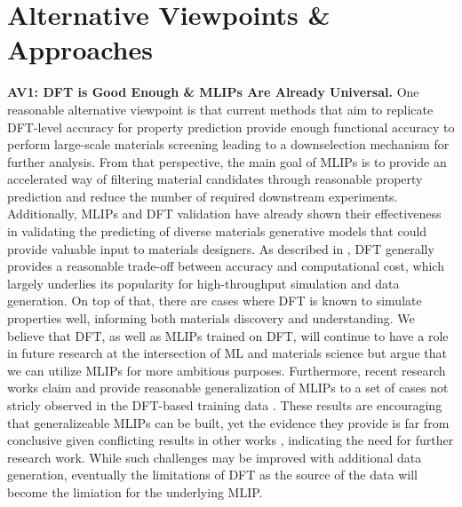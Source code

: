\vspace{-0.2cm}
\section{Alternative Viewpoints \& Approaches}
\vspace{-0.1cm}
\textbf{AV1: DFT is Good Enough \& MLIPs Are Already Universal.} One reasonable alternative viewpoint is that current methods that aim to replicate DFT-level accuracy for property prediction provide enough functional accuracy to perform large-scale materials screening leading to a downselection mechanism for further analysis. From that perspective, the main goal of MLIPs is to provide an accelerated way of filtering material candidates through reasonable property prediction and reduce the number of required downstream experiments. Additionally, MLIPs and DFT validation have already shown their effectiveness in validating the predicting of diverse materials generative models \citep{merchant2023scaling, levy2024symmcd, jiao2024space, zeni2025generative, miller2024flowmm, ding2024matexpert, gruver2024finetuned} that could provide valuable input to materials designers. As described in , DFT generally provides a reasonable trade-off between accuracy and computational cost, which largely underlies its popularity for high-throughput simulation and data generation. On top of that, there are cases where DFT is known to simulate properties well, informing both materials discovery and understanding. We believe that DFT, as well as MLIPs trained on DFT, will continue to have a role in future research at the intersection of ML and materials science but argue that we can utilize MLIPs for more ambitious purposes. Furthermore, recent research works claim and provide reasonable generalization of MLIPs to a set of cases not stricly observed in the DFT-based training data \citep{yang2024mattersim, merchant2023scaling, batatia2023foundation}. These results are encouraging that generalizeable MLIPs can be built, yet the evidence they provide is far from conclusive given conflicting results in other works \citep{bihani2024egraffbench, gonzales2024benchmarking}, indicating the need for further research work. While such challenges may be improved with additional data generation, eventually the limitations of DFT as the source of the data will become the limiation for the underlying MLIP.

